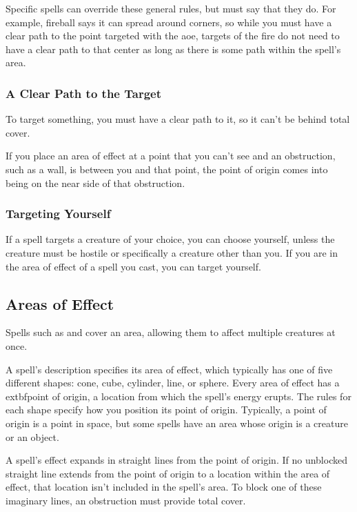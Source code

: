 Specific spells can override these general rules, but must say that they do. For example, fireball says it can spread around corners, so while you must have a clear path to the point targeted with the aoe, targets of the fire do not need to have a clear path to that center as long as there is some path within the spell's area.

\subsubsection{A Clear Path to the Target}

To target something, you must have a clear path to it, so it can't be behind total cover.

If you place an area of effect at a point that you can't see and an obstruction, such as a wall, is between you and that point, the point of origin comes into being on the near side of that obstruction.

\subsubsection{Targeting Yourself}

If a spell targets a creature of your choice, you can choose yourself, unless the creature must be hostile or specifically a creature other than you. If you are in the area of effect of a spell you cast, you can target yourself.

\subsection{Areas of Effect}\label{subsec:areas-of-effect}

Spells such as  and  cover an area, allowing them to affect multiple creatures at once.

A spell's description specifies its area of effect, which typically has one of five different shapes: cone, cube, cylinder, line, or sphere. Every area of effect has a 	extbf{point of origin}, a location from which the spell's energy erupts. The rules for each shape specify how you position its point of origin. Typically, a point of origin is a point in space, but some spells have an area whose origin is a creature or an object.

A spell's effect expands in straight lines from the point of origin. If no unblocked straight line extends from the point of origin to a location within the area of effect, that location isn't included in the spell's area. To block one of these imaginary lines, an obstruction must provide total cover.

